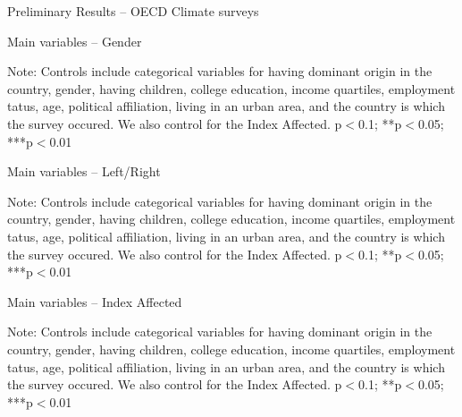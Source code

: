 \documentclass{article}
\begin{document}
\begin{LARGE}
	\begin{center}
		Preliminary Results – OECD Climate surveys	
	\end{center}
	
\end{LARGE}
	\tableofcontents
	\listoftables

\clearpage

\begin{table}[h!]
	\caption{Main variables -- Gender}
	\begin{center}
		\scalebox{0.55}{}
	\end{center}
	{\footnotesize Note: Controls include categorical variables for having dominant origin in the country, gender, having children, college education, income quartiles, employment tatus, age, political affiliation, living in an urban area, and the country is which the survey occured. We also control for the Index Affected.
	\newline *p$<$0.1; **p$<$0.05; ***p$<$0.01}
\end{table}	

\begin{table}[h!]
	\caption{Main variables -- Left/Right}
	\begin{center}
		\scalebox{0.55}{}
	\end{center}
	{\footnotesize Note: Controls include categorical variables for having dominant origin in the country, gender, having children, college education, income quartiles, employment tatus, age, political affiliation, living in an urban area, and the country is which the survey occured. We also control for the Index Affected.
	\newline *p$<$0.1; **p$<$0.05; ***p$<$0.01}
\end{table}	

\begin{table}[h!]
	\caption{Main variables -- Index Affected}
	\begin{center}
		\scalebox{0.55}{}
	\end{center}
	{\footnotesize Note: Controls include categorical variables for having dominant origin in the country, gender, having children, college education, income quartiles, employment tatus, age, political affiliation, living in an urban area, and the country is which the survey occured. We also control for the Index Affected.
	\newline *p$<$0.1; **p$<$0.05; ***p$<$0.01}
\end{table}	
\end{document}
